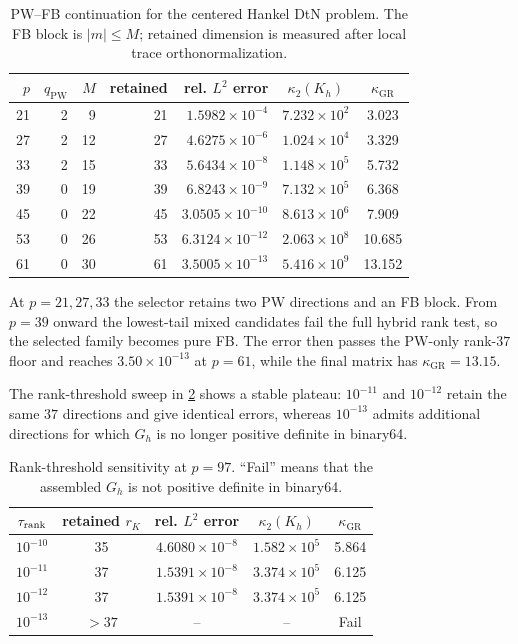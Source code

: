 \documentclass[11pt]{article}
\newcommand{\GR}{\mathrm{GR}}
\newcommand{\PW}{\mathrm{PW}}
\numberwithin{equation}{section}
\begin{document}
\begin{table}[!htbp]
\centering
\caption{PW--FB continuation for the centered Hankel DtN problem.  The FB block is $|m|\le M$; retained dimension is measured after local trace orthonormalization.}
\label{tab:hankel-hybrid-continuation}
\footnotesize
\begin{tabular}{rrrrrcc}
\toprule
$p$ & $q_{\PW}$ & $M$ & retained & rel. $L^2$ error & $\kappa_2(K_h)$ & $\kappa_{\GR}$\\
\midrule
21 & 2 &  9 & 21 & $1.5982\times10^{-4}$ & $7.232\times10^{2}$ & 3.023\\
27 & 2 & 12 & 27 & $4.6275\times10^{-6}$ & $1.024\times10^{4}$ & 3.329\\
33 & 2 & 15 & 33 & $5.6434\times10^{-8}$ & $1.148\times10^{5}$ & 5.732\\
39 & 0 & 19 & 39 & $6.8243\times10^{-9}$ & $7.132\times10^{5}$ & 6.368\\
45 & 0 & 22 & 45 & $3.0505\times10^{-10}$ & $8.613\times10^{6}$ & 7.909\\
53 & 0 & 26 & 53 & $6.3124\times10^{-12}$ & $2.063\times10^{8}$ & 10.685\\
61 & 0 & 30 & 61 & $3.5005\times10^{-13}$ & $5.416\times10^{9}$ & 13.152\\
\bottomrule
\end{tabular}
\end{table}

At $p=21,27,33$ the selector retains two PW directions and an FB block.  From $p=39$ onward the lowest-tail mixed candidates fail the full hybrid rank test, so the selected family becomes pure FB.  The error then passes the PW-only rank-$37$ floor and reaches $3.50\times10^{-13}$ at $p=61$, while the final matrix has $\kappa_{\GR}=13.15$.

The rank-threshold sweep in \cref{tab:hankel-rank-sensitivity} shows a stable plateau: $10^{-11}$ and $10^{-12}$ retain the same $37$ directions and give identical errors, whereas $10^{-13}$ admits additional directions for which $G_h$ is no longer positive definite in binary64.

\begin{table}[!htbp]
\centering
\caption{Rank-threshold sensitivity at $p=97$.  ``Fail'' means that the assembled $G_h$ is not positive definite in binary64.}
\label{tab:hankel-rank-sensitivity}
\footnotesize
\begin{tabular}{ccccc}
\toprule
$\tau_{\rm rank}$ & retained $r_K$ & rel. $L^2$ error & $\kappa_2(K_h)$ & $\kappa_{\GR}$\\
\midrule
$10^{-10}$ & 35 & $4.6080\times10^{-8}$ & $1.582\times10^5$ & 5.864\\
$10^{-11}$ & 37 & $1.5391\times10^{-8}$ & $3.374\times10^5$ & 6.125\\
$10^{-12}$ & 37 & $1.5391\times10^{-8}$ & $3.374\times10^5$ & 6.125\\
$10^{-13}$ & $>37$ & -- & -- & Fail\\
\bottomrule
\end{tabular}
\end{table}
\end{document}
